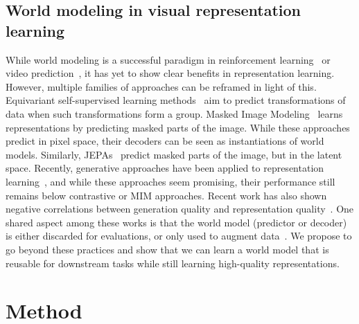 \documentclass[twocolumn]{fairmeta}
\theoremstyle{plain}
\theoremstyle{definition}
\theoremstyle{remark}
\begin{document}
\subsection{World modeling in visual representation learning}
While world modeling is a successful paradigm in reinforcement learning~\cite{hafner2019dreamer,hafner2023dreamerv3} or video prediction~\cite{yang2023unisim,hu2023gaia1}, it has yet to show clear benefits in representation learning.
However, multiple families of approaches can be reframed in light of this.
Equivariant self-supervised learning methods~\citep{devillers2022equimod,park_learning_2022,garrido2023sie,gupta2023care,dangovski_equivariant_2022} aim to predict transformations of data when such transformations form a group.
Masked Image Modeling~\cite{he2021mae,bao2021beit,el2024aim,xie2022simmim} learns representations by predicting masked parts of the image. While these approaches predict in pixel space, their decoders can be seen as instantiations of world models. Similarly, JEPAs~\citep{assran2023ijepa,baevski2022data2vec} predict masked parts of the image, but in the latent space.
Recently, generative approaches have been applied to representation learning~\cite{hudson2023soda,clark2023text,chen2024dae}, and while these approaches seem promising, their performance still remains below contrastive or MIM approaches. Recent work has also shown negative correlations between generation quality and representation quality~\citep{chen2024dae}.
One shared aspect among these works is that the world model (predictor or decoder) is either discarded for evaluations, or only used to augment data~\citep{hudson2023soda}. We propose to go beyond these practices and show that we can learn a world model that is reusable for downstream tasks while still learning high-quality representations.


\section{Method}
\end{document}
